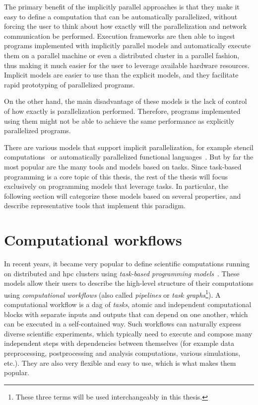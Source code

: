 The primary benefit of the implicitly parallel approaches is that they make it easy to define a
computation that can be automatically parallelized, without forcing the user to think about how
exactly will the parallelization and network communication be performed. Execution frameworks are
then able to ingest programs implemented with implicitly parallel models and automatically execute
them on a parallel machine or even a distributed cluster in a parallel fashion, thus making it much
easier for the user to leverage available hardware resources. Implicit models are easier to use
than the explicit models, and they facilitate rapid prototyping of parallelized programs.

On the other hand, the main disadvantage of these models is the lack of control of how exactly is
parallelization performed. Therefore, programs implemented using them might not be able to achieve
the same performance as explicitly parallelized programs.

There are various models that support implicit parallelization, for example stencil
computations~\cite{stencil} or automatically parallelized functional
languages~\cite{parallel_haskell}. But by far the most popular are the many tools and models
based on tasks. Since task-based programming is a core topic of this thesis, the rest of the thesis
will focus exclusively on programming models that leverage tasks. In particular, the following
section will categorize these models based on several properties, and describe representative tools
that implement this paradigm.

\section{Computational workflows}
In recent years, it became very popular to define scientific computations running on distributed
and \gls{hpc} clusters using
\emph{task-based programming models}~\cite{pegasus,workflows1,workflows_at_scale}. These models allow their users to describe
the high-level structure of their computations using \emph{computational workflows} (also called \emph{pipelines} or \emph{task graphs}\footnote{These three terms will be used interchangeably in this thesis.}). A computational
workflow is a \gls{dag} of \emph{tasks}, atomic and independent
computational blocks with separate inputs and outputs that can depend on one another, which can be
executed in a self-contained way. Such workflows can naturally express diverse scientific
experiments, which typically need to execute and compose many independent steps with dependencies
between themselves (for example data preprocessing, postprocessing and analysis computations,
various simulations, etc.). They are also very flexible and easy to use, which is what makes them
popular.


